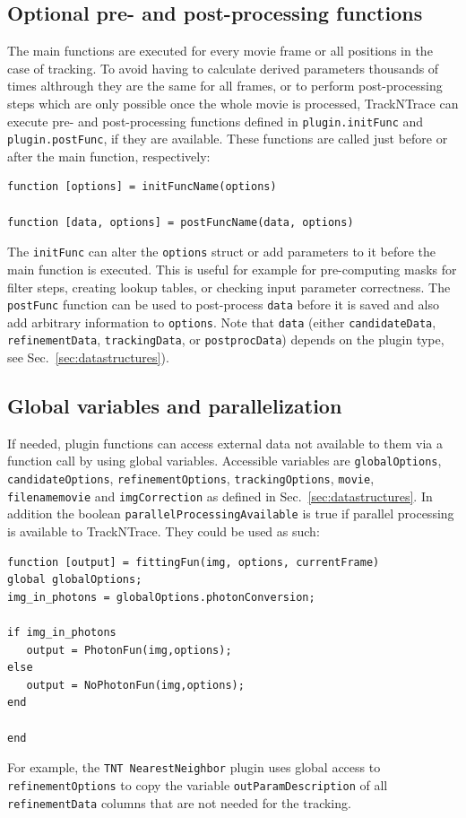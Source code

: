 \documentclass[11pt,onside]{report}
\numberwithin{equation}{chapter}
\begin{document}
\subsection{Optional pre- and post-processing functions}
The main functions are executed for every movie frame or all positions in the case of tracking. To avoid having to calculate derived parameters thousands of times althrough they are the same for all frames, or to perform post-processing steps which are only possible once the whole movie is processed, TrackNTrace can execute pre- and post-processing functions defined in \texttt{plugin.initFunc} and \texttt{plugin.postFunc}, if they are available. These functions are called just before or after the main function, respectively:
\begin{lstlisting}[style=Matlab-editor]
function [options] = initFuncName(options)

function [data, options] = postFuncName(data, options)
\end{lstlisting}
The \texttt{initFunc} can alter the \texttt{options} struct or add parameters to it before the main function is executed. This is useful for example for pre-computing masks for filter steps, creating lookup tables, or checking input parameter correctness. The \texttt{postFunc} function can be used to post-process \texttt{data} before it is saved and also add arbitrary information to \texttt{options}. Note that \texttt{data} (either \texttt{candidateData}, \texttt{refinementData}, \texttt{trackingData}, or \texttt{postprocData}) depends on the plugin type, see Sec.~\ref{sec:datastructures}). 

\subsection{Global variables and parallelization}
If needed, plugin functions can access external data not available to them via a function call by using global variables. Accessible variables are  \texttt{globalOptions}, \texttt{candidateOptions}, \texttt{refinementOptions}, \texttt{trackingOptions}, \texttt{movie}, \texttt{filename\textunderscore movie} and \texttt{imgCorrection} as defined in Sec.~\ref{sec:datastructures}. In addition the boolean \texttt{parallelProcessingAvailable} is true if parallel processing is available to TrackNTrace. They could be used as such:
\begin{lstlisting}[style=Matlab-editor]
function [output] = fittingFun(img, options, currentFrame)
global globalOptions;
img_in_photons = globalOptions.photonConversion;

if img_in_photons
   output = PhotonFun(img,options);
else
   output = NoPhotonFun(img,options);
end

end
\end{lstlisting}
For example, the \texttt{TNT NearestNeighbor} plugin uses global access to \texttt{refinementOptions} to copy the variable \texttt{outParamDescription} of all \texttt{refinementData} columns that are not needed for the tracking. 
\end{document}
